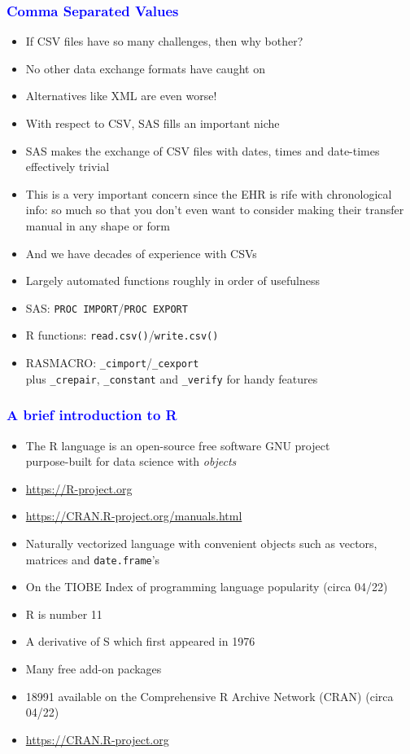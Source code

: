 \documentclass[11pt,pdftex,dvipsnames,usenames]{beamer}
\begin{document}
\begin{frame}[fragile]\frametitle{\bf\textcolor{blue}{Comma Separated Values}}

\begin{itemize}
\item If CSV files have so many challenges, then why bother?
\item No other data exchange formats have caught on
\item Alternatives like XML are even worse!
\item With respect to CSV, SAS fills an important niche
\item SAS makes the exchange of CSV files with dates, times
and date-times effectively trivial
\item This is a very important concern since the EHR is rife
with chronological info: so much so that you don't even want to
consider making their transfer manual in any shape or form
\item And we have decades of experience with CSVs
\item Largely automated functions roughly in order of usefulness
\item SAS: \texttt{PROC IMPORT}/\texttt{PROC EXPORT}
\item R functions: \texttt{read.csv()}/\texttt{write.csv()}
\item RASMACRO: \texttt{\_cimport}/\texttt{\_cexport}\\
plus \texttt{\_crepair}, \texttt{\_constant}
and \texttt{\_verify} for handy features
\end{itemize}

\end{frame}


\begin{frame}[fragile]\frametitle{\bf\textcolor{blue}{A brief introduction to R}}

\begin{itemize}
\item The R language is an open-source free software GNU project\\
 purpose-built for data science with {\it objects}
\item \href{https://R-project.org}{https://R-project.org}
\item \href{https://CRAN.R-project.org/manuals.html}{https://CRAN.R-project.org/manuals.html}
\item Naturally vectorized language with convenient objects such as vectors,
matrices and \texttt{date.frame}'s
\item On the TIOBE Index of programming language popularity (circa 04/22)
\item R is number 11 
\item A derivative of S which first appeared in 1976
\item Many free add-on packages
\item 18991 available on the Comprehensive R Archive Network (CRAN) (circa 04/22)
\item \href{https://CRAN.R-project.org}{https://CRAN.R-project.org}
\end{itemize}

\end{frame}
\end{document}
